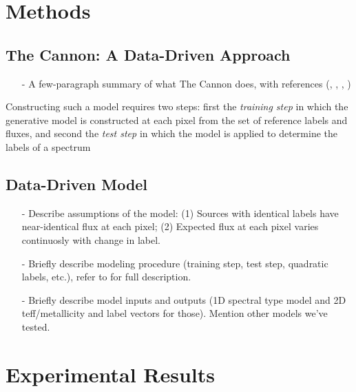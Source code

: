 \documentclass[modern]{aastex62}
\begin{document}
\section{Methods} \label{sec:cannon}

\subsection{The Cannon: A Data-Driven Approach}

\begin{enumerate}
\item[-] A few-paragraph summary of what The Cannon does, with references (\citealt{Ness:2015}, \citealt{Casey:2016}, \citealt{Ho:2017a}, \citealt{Ho:2017b})
\end{enumerate}

Constructing such a model requires two steps: first the \emph{training step} in which the generative model is constructed at each pixel from the set of reference labels and fluxes, and second the \emph{test step} in which the model is applied to determine the labels of a spectrum 


\subsection{Data-Driven Model}
\begin{enumerate}
\item[-] Describe assumptions of the model: (1) Sources with identical labels have near-identical flux at each pixel; (2) Expected flux at each pixel varies continuosly with change in label. 
\item[-] Briefly describe modeling procedure (training step, test step, quadratic labels, etc.), refer to \citealt{Ness:2015} for full description.
\item[-] Briefly describe model inputs and outputs (1D spectral type model and 2D teff/metallicity and label vectors for those). Mention other models we've tested.
\end{enumerate}


\section{Experimental Results} \label{sec:results}
\end{document}
